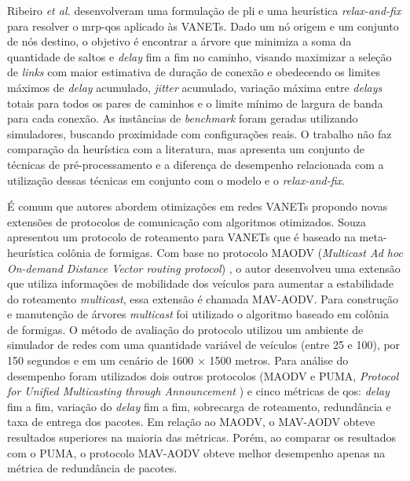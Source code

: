 Ribeiro {\em et al.} \cite{tiago:2019} desenvolveram uma formulação de
\gls{pli}  e uma  heurística  \textit{relax-and-fix}  para resolver  o
\gls{mrp-qos} aplicado às  VANETs. Dado um nó origem e  um conjunto de
nós destino,  o objetivo é encontrar  a árvore que minimiza  a soma da
quantidade de  saltos e \textit{delay}  fim a fim no  caminho, visando
maximizar a seleção de \textit{links}  com maior estimativa de duração
de  conexão   e  obedecendo  os  limites   máximos  de  \textit{delay}
acumulado,   \textit{jitter}   acumulado,    variação   máxima   entre
\textit{delays}  totais para  todos os  pares de  caminhos e  o limite
mínimo  de  largura de  banda  para  cada  conexão. As  instâncias  de
\textit{benchmark}  foram  geradas  utilizando  simuladores,  buscando
proximidade com configurações reais. O  trabalho não faz comparação da
heurística com a literatura, mas  apresenta um conjunto de técnicas de
pré-processamento  e  a  diferença  de desempenho  relacionada  com  a
utilização   dessas  técnicas   em   conjunto  com   o   modelo  e   o
\textit{relax-and-fix}.

É comum que autores abordem otimizações em redes VANETs propondo novas
extensões  de protocolos  de  comunicação  com algoritmos  otimizados.
Souza  \cite{souza:2012} apresentou  um protocolo  de roteamento  para
VANETs que é baseado na  meta-heurística colônia de formigas. Com base
no protocolo  MAODV ({\em Multicast  Ad hoc On-demand  Distance Vector
  routing  protocol})  \cite{royer:2001},   o  autor  desenvolveu  uma
extensão  que  utiliza informações  de  mobilidade  dos veículos  para
aumentar  a   estabilidade  do  roteamento   \textit{multicast},  essa
extensão é chamada  MAV-AODV. Para construção e  manutenção de árvores
\textit{multicast}  foi utilizado  o algoritmo  baseado em  colônia de
formigas. O método  de avaliação do protocolo utilizou  um ambiente de
simulador de redes com uma quantidade variável de veículos (entre 25 e
100), por 150  segundos e em um cenário de  1600 $\times$ 1500 metros.
Para  análise do  desempenho foram  utilizados dois  outros protocolos
(MAODV  e  PUMA,  {\em   Protocol  for  Unified  Multicasting  through
  Announcement}  \cite{garcia:2004}) e  cinco  métricas de  \gls{qos}:
\textit{delay}  fim  a fim,  variação  do  \textit{delay} fim  a  fim,
sobrecarga de roteamento,  redundância e taxa de  entrega dos pacotes.
Em  relação  ao MAODV,  o  MAV-AODV  obteve resultados  superiores  na
maioria das métricas.  Porém, ao comparar  os resultados com o PUMA, o
protocolo  MAV-AODV  obteve melhor  desempenho  apenas  na métrica  de
redundância de pacotes.

